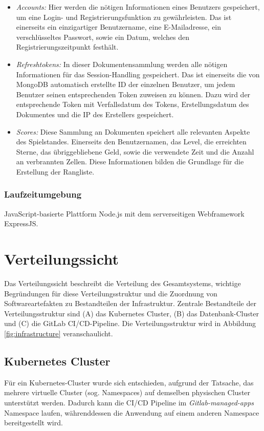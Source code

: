 \documentclass[letterpaper, 10 pt, conference]{ieeeconf}
\begin{document}
\begin{itemize}
\item
\textit{Accounts:} Hier werden die nötigen Informationen eines Benutzers gespeichert, um
eine Login- und Registrierungsfunktion zu gewährleisten. Das ist einerseits ein
einzigartiger Benutzername, eine E-Mailadresse, ein verschlüsseltes Passwort, sowie
ein Datum, welches den Registrierungszeitpunkt festhält.
\item
\textit{Refreshtokens:} In dieser Dokumentensammlung werden alle nötigen Informationen für
das Session-Handling gespeichert. Das ist einerseits die von MongoDB automatisch
erstellte ID der einzelnen Benutzer, um jedem Benutzer seinen entsprechenden Token
zuweisen zu können. Dazu wird der entsprechende Token mit Verfallsdatum
des Tokens,  Erstellungsdatum des Dokumentes und die IP des Erstellers gespeichert.
\item
\textit{Scores:} Diese Sammlung an Dokumenten speichert alle relevanten Aspekte des
Spielstandes. Einerseits den Benutzernamen, das Level, die erreichten Sterne, das
übriggebliebene Geld, sowie die verwendete Zeit und die Anzahl an verbrannten Zellen.
Diese Informationen bilden die Grundlage für die Erstellung der Rangliste.
\end{itemize}

\subsubsection{Laufzeitumgebung}

JavaScript-basierte Plattform Node.js mit dem serverseitigen Webframework ExpressJS.

\section{Verteilungssicht}
Das Verteilungssicht beschreibt die Verteilung des Gesamtsystems,  wichtige Begründungen für diese Verteilungsstruktur und die Zuordnung von Softwareartefakten zu Bestandteilen der Infrastruktur.
Zentrale Bestandteile der Verteilungsstruktur sind (A) das Kubernetes Cluster,  (B) das Datenbank-Cluster und (C) die GitLab CI/CD-Pipeline.  Die Verteilungsstruktur wird in Abbildung \ref{fig:infrastructure}  veranschaulicht.

\subsection{Kubernetes Cluster}

Für ein Kubernetes-Cluster wurde sich entschieden, aufgrund der Tatsache, das mehrere virtuelle Cluster (sog. Namespaces) auf demselben physischen Cluster unterstützt werden. Dadurch kann die CI/CD Pipeline im \textit{Gitlab-managed-apps} Namespace laufen, währenddessen die Anwendung auf einem anderen Namespace bereitgestellt wird.
\end{document}
